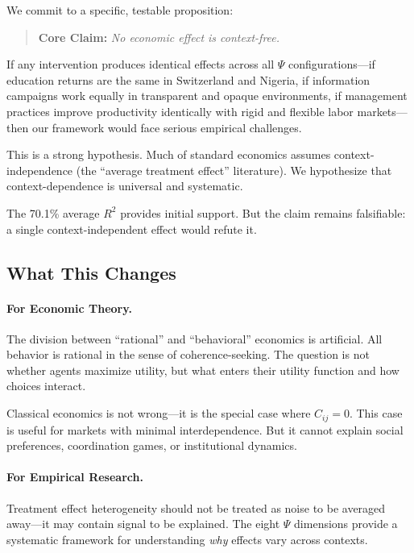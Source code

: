 We commit to a specific, testable proposition:

\begin{quote}
\textbf{Core Claim:} \emph{No economic effect is context-free.}
\end{quote}

If any intervention produces identical effects across all $\Psi$ configurations---if education returns are the same in Switzerland and Nigeria, if information campaigns work equally in transparent and opaque environments, if management practices improve productivity identically with rigid and flexible labor markets---then our framework would face serious empirical challenges.

This is a strong hypothesis. Much of standard economics assumes context-independence (the ``average treatment effect'' literature). We hypothesize that context-dependence is universal and systematic.

The 70.1\% average $R^2$ provides initial support. But the claim remains falsifiable: a single context-independent effect would refute it.

\subsection{What This Changes}

\paragraph{For Economic Theory.}
The division between ``rational'' and ``behavioral'' economics is artificial. All behavior is rational in the sense of coherence-seeking. The question is not whether agents maximize utility, but what enters their utility function and how choices interact.

Classical economics is not wrong---it is the special case where $C_{ij} = 0$.
This case is useful for markets with minimal interdependence.
But it cannot explain social preferences, coordination games, or institutional dynamics.

\paragraph{For Empirical Research.}
Treatment effect heterogeneity should not be treated as noise to be averaged away---it may contain signal to be explained. The eight $\Psi$ dimensions provide a systematic framework for understanding \emph{why} effects vary across contexts.

